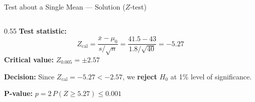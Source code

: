 \documentclass[12pt, aspectratio=169]{beamer}
\begin{document}
    \begin{frame}{Test about a Single Mean --- Solution ($Z$-test)}
        \begin{columns}
            \begin{column}{0.55\textwidth}
                \textbf{Test statistic:}
                \[
                    Z_{\text{cal}} = \frac{\bar{x} - \mu_0}{s/\sqrt{n}}
                    = \frac{41.5 - 43}{1.8/\sqrt{40}} = -5.27
                \]
                \textbf{Critical value:} $Z_{0.005} = \pm 2.57$

                \vspace{0.5em}

                \textbf{Decision:} Since $Z_{\text{cal}} = -5.27 < -2.57$,
                we \textbf{reject} $H_0$ at 1\% level of significance.

                \vspace{0.5em}

                \textbf{P-value:} \(p = 2\,P(Z \geqslant 5.27) \leqslant 0.001\)

                \vspace{0.5em}


\end{column}
\end{columns}
\end{frame}
\end{document}
